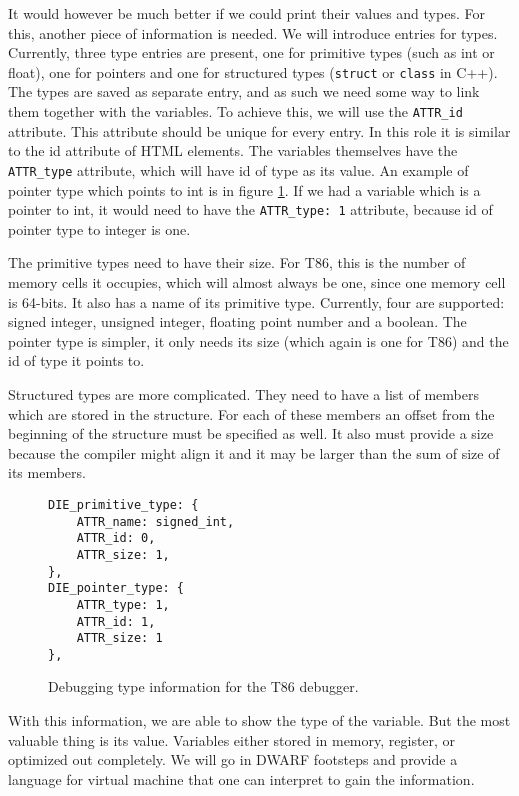 It would however be much better if we could print their values and types. For
this, another piece of information is needed. We will introduce entries for
types. Currently, three type entries are present, one for primitive types (such
as int or float), one for pointers and one for structured types
(\texttt{struct} or \texttt{class} in C++). The types are saved as separate
entry, and as such we need some way to link them together with the variables.
To achieve this, we will use the \texttt{ATTR\_id} attribute. This attribute
should be unique for every entry. In this role it is similar to the id
attribute of HTML elements. The variables themselves have the \texttt{ATTR\_type}
attribute, which will have id of type as its value. An example of pointer type
which points to int is in figure \ref{fig:t86dbg-types}. If we had a variable
which is a pointer to int, it would need to have the \texttt{ATTR\_type: 1}
attribute, because id of pointer type to integer is one.

The primitive types need to have their size. For T86, this is the number of
memory cells it occupies, which will almost always be one, since one memory
cell is 64-bits. It also has a name of its primitive type. Currently, four are
supported: signed integer, unsigned integer, floating point number and a
boolean. The pointer type is simpler, it only needs its size (which again
is one for T86) and the id of type it points to.

Structured types are more complicated. They need to have a list of members
which are stored in the structure. For each of these members an offset
from the beginning of the structure must be specified as well. It also must
provide a size because the compiler might align it and it may be larger
than the sum of size of its members.

\begin{figure}
    \begin{lstlisting}
DIE_primitive_type: {
    ATTR_name: signed_int,
    ATTR_id: 0,
    ATTR_size: 1,
},
DIE_pointer_type: {
    ATTR_type: 1,
    ATTR_id: 1,
    ATTR_size: 1
},
    \end{lstlisting}
    \caption{Debugging type information for the T86 debugger.}
    \label{fig:t86dbg-types}
\end{figure}

With this information, we are able to show the type of the variable.
But the most valuable thing is its value. Variables either stored
in memory, register, or optimized out completely. We will go in
DWARF footsteps and provide a language for virtual machine that one
can interpret to gain the information.

